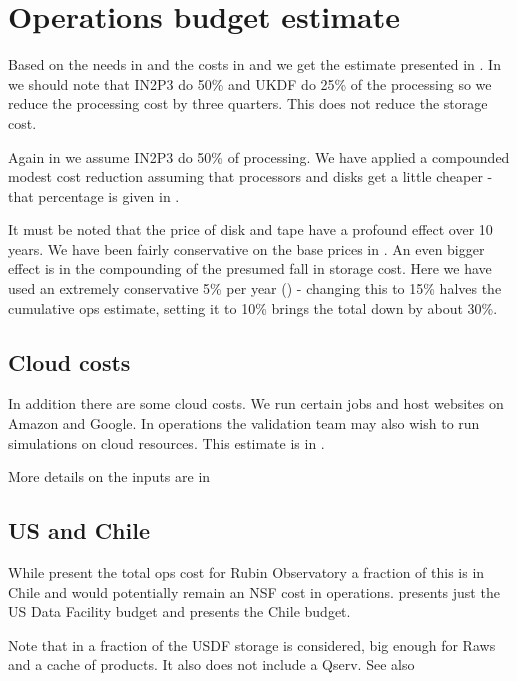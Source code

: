\section{Operations budget estimate}\label{sec:opscost}
Based on the needs in  and the costs in  and 
we get the estimate presented in .
In  we should note that IN2P3 do 50\%  and UKDF do 25\% of the processing so we reduce the processing cost by three quarters.
This does not reduce the storage cost.



Again in  we assume IN2P3 do 50\% of processing.
We have applied a compounded modest cost reduction assuming that processors  and disks get a little cheaper - that
percentage is given in .

It must be noted that the price of disk and tape have a profound effect over 10 years. We have been fairly conservative on the base prices
in . An even bigger effect is in the compounding of the presumed fall in storage cost. Here we have used an extremely
conservative 5\% per year () - changing this to 15\% halves the cumulative ops estimate, setting it to 10\% brings the
total down by about 30\%.

\subsection{Cloud costs}
In addition there are some cloud costs. We run certain jobs and host websites on Amazon and Google. In operations
the validation team may also wish to run simulations on cloud resources. This estimate is in .




More details on the inputs are in 

\subsection{US and Chile}
While  present the total ops cost for Rubin Observatory a fraction of this is in Chile and would potentially remain an NSF cost in operations.  presents just the US Data Facility budget  and
 presents the Chile budget.



Note that in  a fraction of the USDF storage is considered, big enough for Raws and a cache of products. It also does not include a Qserv. See also 

